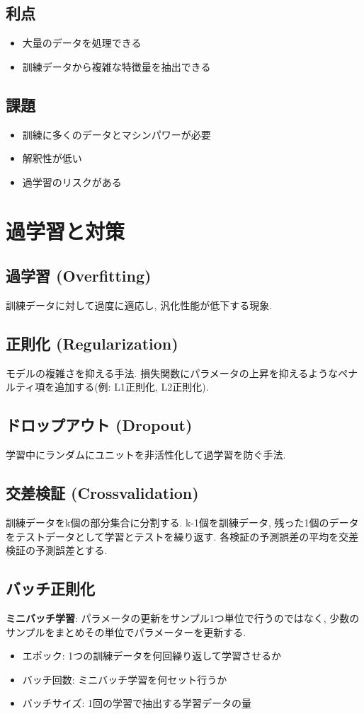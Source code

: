 \documentclass[dvipdfmx, 10pt]{jsarticle}
\begin{document}
\subsection*{利点}
\begin{itemize}
    \item 大量のデータを処理できる
    \item 訓練データから複雑な特徴量を抽出できる
\end{itemize}

\subsection*{課題}
\begin{itemize}
    \item 訓練に多くのデータとマシンパワーが必要
    \item 解釈性が低い
    \item 過学習のリスクがある
\end{itemize}

\section*{過学習と対策}
\subsection*{過学習 (Overfitting)}
訓練データに対して過度に適応し, 汎化性能が低下する現象. 

\subsection*{正則化 (Regularization)}
モデルの複雑さを抑える手法. 損失関数にパラメータの上昇を抑えるようなペナルティ項を追加する(例: L1正則化, L2正則化). 

\subsection*{ドロップアウト (Dropout)}
学習中にランダムにユニットを非活性化して過学習を防ぐ手法. 

\subsection*{交差検証 (Crossvalidation)}
訓練データをk個の部分集合に分割する. k-1個を訓練データ, 残った1個のデータをテストデータとして学習とテストを繰り返す. 
各検証の予測誤差の平均を交差検証の予測誤差とする. 

\subsection*{バッチ正則化}
\textbf{ミニバッチ学習}:
パラメータの更新をサンプル1つ単位で行うのではなく, 少数のサンプルをまとめその単位でパラメーターを更新する. 
\begin{itemize}
    \item エポック: 1つの訓練データを何回繰り返して学習させるか
    \item バッチ回数: ミニバッチ学習を何セット行うか
    \item バッチサイズ: 1回の学習で抽出する学習データの量
\end{itemize}
\end{document}
